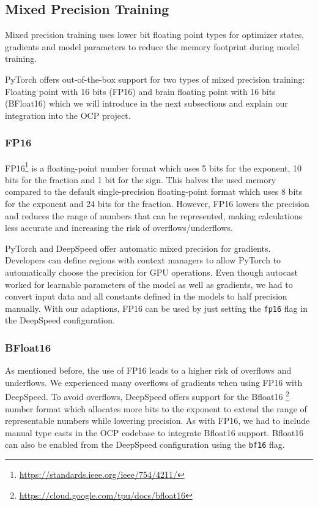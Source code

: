 \subsection{Mixed Precision Training}
\label{subsection:mixedprecision}

Mixed precision training uses lower bit floating point types for optimizer states, gradients and model parameters to 
reduce the memory footprint during model training. 

PyTorch offers out-of-the-box support for two types of mixed precision training: Floating point with 16 bits (FP16) and 
brain floating point with 16 bits (BFloat16) which we will introduce in the next subsections and explain our integration 
into the OCP project.

\subsubsection{FP16}

FP16\footnote{\url{https://standards.ieee.org/ieee/754/4211/}} is a floating-point number format which uses 5 bits for the exponent, 10 bits for the fraction and 1 bit for the 
sign. This halves the used memory compared to the default single-precision floating-point format which uses 8 bits 
for the exponent and 24 bits for the fraction. However, FP16 lowers the precision and reduces the range of numbers 
that can be represented, making calculations less accurate and increasing the risk of overflows/underflows.

PyTorch and DeepSpeed offer automatic mixed precision for gradients. Developers can define regions with context managers 
to allow PyTorch to automatically choose the precision for GPU operations. Even though autocast worked for learnable
parameters of the model as well as gradients, we had to convert input data and all constants defined in the models to half
precision manually. With our adaptions, 
FP16 can be used by just setting the \texttt{fp16} flag in the DeepSpeed configuration.

\subsubsection{BFloat16}

As mentioned before, the use of FP16 leads to a higher risk of overflows and underflows. We experienced many overflows 
of gradients when using FP16 with DeepSpeed. To avoid overflows, DeepSpeed offers support for the Bfloat16
\footnote{\url{https://cloud.google.com/tpu/docs/bfloat16}}
number format which allocates more bits to the exponent to extend the range of representable numbers while lowering 
precision.
As with FP16, we had to include manual type casts in the OCP codebase to integrate Bfloat16 support. 
Bfloat16 can also be enabled from the DeepSpeed configuration using the \texttt{bf16} flag.



